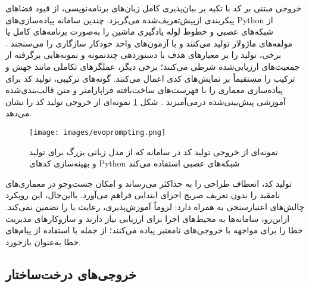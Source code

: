 خروجی مبتنی بر کد با تکیه بر بیان‌پذیری کامل زبان‌های برنامه‌نویسی، از قیود فضاهای پیکربندی ازپیش‌تعریف‌شده می‌گریزد. چندین سامانه پیاده‌سازی‌های Python از شبکه‌های عصبی و خطوط لوله یادگیری ماشین را به‌صورت برنامه‌های کامل یا مولفه‌های ماژولار تولید می‌کنند و با آزمون‌های واحد خودکار سازگاری را می‌سنجند \cite{xu2024largeTextToML, LLMatic2024, chen2023Evoprompting}. برخی، تولید را بر معیارهای هدف با دستوردهی چندنمونه و نمونه‌هایی برگرفته از جمعیت‌های ارزیابی‌شده شرطی می‌کنند؛ برخی دیگر، عملگرهای تکاملی مانند جهش و ترکیب را مستقیماً بر نمایش‌های کدی اعمال می‌کنند. گونه‌های ترکیبی، تولید کد برای پیاده‌سازی معماری را با فهرست‌های ساخت‌یافته فراپارامتر و متن قالب‌بندی‌شده  آموزشی پیش‌بینی‌شده درمی‌آمیزند \cite{zhang2023AutomlGPTAutomaticMachineLearning, trirat2025automlagent}. شکل \ref{fig:evoprompting} نمونه‌ای از خروجی تولید کد را نشان می‌دهد.
\begin{figure}[h!]
    \centering
    \texttt{[image: images/evoprompting.png]}
    \caption[نمونه ای از خروجی تولید کد]{
        نمونه‌ای از خروجی تولید کد در سامانه  که از مدل زبانی بزرگ برای تولید و بهینه‌سازی کدهای Python شبکه‌های عصبی استفاده می‌کند \cite{chen2023Evoprompting}
    }
    \label{fig:evoprompting}
\end{figure}
تولید کد، انعطاف طراحی را به حداکثر می‌رساند و امکان جست‌وجو در معماری‌های نامقید را بدون تعریف صریح اجزای ابتدایی فراهم می‌آورد. بااین‌حال، این رویکرد چالش‌های اعتبارسنجی به همراه دارد:  لزوماً آموزش‌پذیری، رعایت  یا  را تضمین نمی‌کند. ازاین‌رو، سامانه‌ها به محیط‌های اجرا برای ارزیابی نیاز دارند و سازوکارهای مدیریت خطا را برای مواجهه با خروجی‌های نامعتبر پیاده می‌کنند؛ از جمله  با استفاده از پیام‌های خطا به‌عنوان بازخورد.

\subsection{خروجی‌های درخت‌ساختار}

